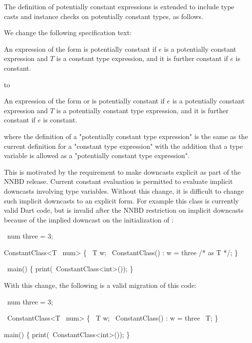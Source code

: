 \documentclass[makeidx]{article}
\begin{document}
The definition of potentially constant expressions is extended to include type
casts and instance checks on potentially constant types, as follows.

We change the following specification text:

An expression of the form  is potentially constant
if $e$ is a potentially constant expression
and $T$ is a constant type expression,
and it is further constant if $e$ is constant.
\EndCase

to

An expression of the form  or
 is potentially constant
if $e$ is a potentially constant expression
and $T$ is a potentially constant type expression,
and it is further constant if $e$ is constant.
\EndCase

where the definition of a "potentially constant type expression" is the same as
the current definition for a "constant type expression" with the addition that a
type variable is allowed as a "potentially constant type expression".

This is motivated by the requirement to make downcasts explicit as part of the
NNBD release.  Current constant evaluation is permitted to evaluate implicit
downcasts involving type variables.  Without this change, it is difficult to
change such implicit downcasts to an explicit form.  For example this class is
currently valid Dart code, but is invalid after the NNBD restriction on implicit
downcasts because of the implied downcast on the initialization of :


\begin{dartCode}
\CONST\ num three = 3;

\CLASS{} ConstantClass<T \EXTENDS\ num> \{
  \FINAL\ T w;
  \CONST\ ConstantClass() : w = three /* as T */;
\}

\VOID\ main() \{
  print(\CONST\ ConstantClass<int>());
\}
\end{dartCode}

With this change, the following is a valid migration of this code:

\begin{dartCode}
\CONST\ num three = 3;

\CLASS\ ConstantClass<T \EXTENDS\ num> \{
  \FINAL\ T w;
  \CONST\ ConstantClass() : w = three \AS\ T;
\}

\VOID{} main() \{
  print(\CONST\ ConstantClass<int>());
\}
\end{dartCode}
\end{document}
